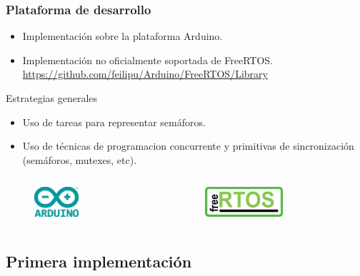 \begin{frame}
\frametitle{Plataforma de desarrollo}
\begin{block}{}
	\begin{itemize}
		\item Implementación sobre la plataforma Arduino.
		\item Implementación no oficialmente soportada de FreeRTOS. \href{https://github.com/feilipu/Arduino/FreeRTOS/Library}{https://github.com/feilipu/Arduino/FreeRTOS/Library}
	\end{itemize}

\end{block}
\begin{block}{Estrategias generales}
	\begin{itemize}
		\item Uso de tareas para representar semáforos.
		\item Uso de técnicas de programacion concurrente y primitivas de sincronización (semáforos, mutexes, etc).
	\end{itemize}
\end{block}
\begin{columns}[T]
	\begin{column}{.35\linewidth}
	\begin{figure}[htbp]
		\centering
		\includegraphics[height=3em, right]{diagramas/arduino.eps}
	\end{figure}
	\end{column}
	\hfill
	\begin{column}{.50\linewidth}
		
		\begin{figure}[htbp]
			\includegraphics[height=3em,left]{diagramas/freertos.eps}
		\end{figure}
		
	\end{column}
\end{columns}
\end{frame}

\subsection{Primera implementación}


